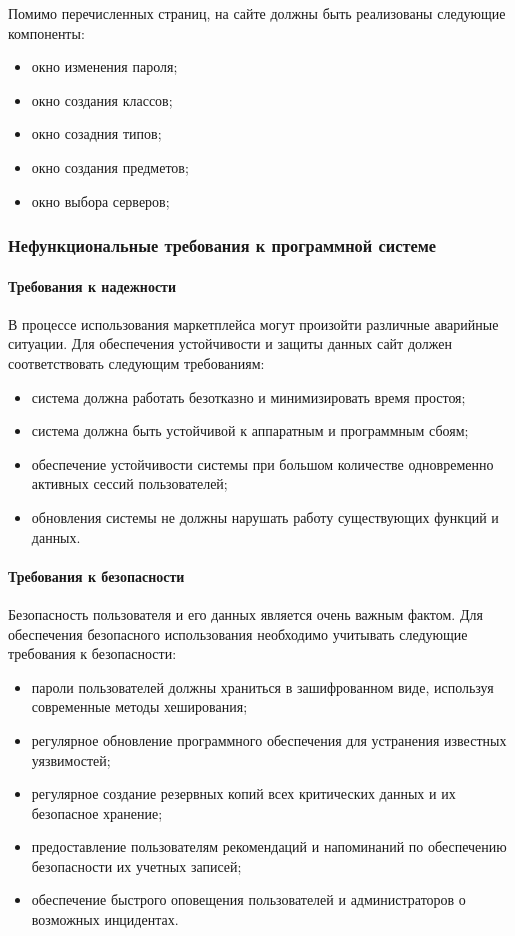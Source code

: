 Помимо перечисленных страниц, на сайте должны быть реализованы следующие компоненты:

\begin{itemize}
	\item окно изменения пароля;
	\item окно создания классов;
	\item окно созадния типов;
	\item окно создания предметов;
	\item окно выбора серверов;
\end{itemize}

\subsubsection{Нефункциональные требования к программной системе}

\paragraph{Требования к надежности}

В процессе использования маркетплейса могут произойти различные аварийные ситуации. Для обеспечения устойчивости и защиты данных сайт должен соответствовать следующим требованиям:

\begin{itemize}
	\item система должна работать безотказно и минимизировать время простоя;
	\item система должна быть устойчивой к аппаратным и программным сбоям;
	\item обеспечение устойчивости системы при большом количестве одновременно активных сессий пользователей;
	\item обновления системы не должны нарушать работу существующих функций и данных.
\end{itemize}

\paragraph{Требования к безопасности}

Безопасность пользователя и его данных является очень важным фактом. Для обеспечения безопасного использования необходимо учитывать следующие требования к безопасности:

\begin{itemize}
	\item пароли пользователей должны храниться в зашифрованном виде, используя современные методы хеширования;
	\item регулярное обновление программного обеспечения для устранения известных уязвимостей;
	\item регулярное создание резервных копий всех критических данных и их безопасное хранение;
	\item предоставление пользователям рекомендаций и напоминаний по обеспечению безопасности их учетных записей;
	\item обеспечение быстрого оповещения пользователей и администраторов о возможных инцидентах.
\end{itemize}

